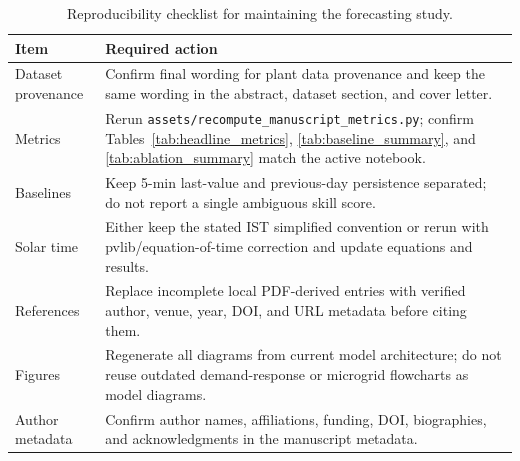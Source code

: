 \begin{table}[!t]
\caption{Reproducibility checklist for maintaining the forecasting study.}
\label{tab:reproducibility_checklist}
\centering
\small
\begin{tabularx}{\textwidth}{@{}l>{\raggedright\arraybackslash}X@{}}
\toprule
Item & Required action \\
\midrule
Dataset provenance & Confirm final wording for plant data provenance and keep the same wording in the abstract, dataset section, and cover letter. \\
Metrics & Rerun \texttt{assets/recompute\_manuscript\_metrics.py}; confirm Tables~\ref{tab:headline_metrics}, \ref{tab:baseline_summary}, and \ref{tab:ablation_summary} match the active notebook. \\
Baselines & Keep 5-min last-value and previous-day persistence separated; do not report a single ambiguous skill score. \\
Solar time & Either keep the stated IST simplified convention or rerun with pvlib/equation-of-time correction and update equations and results. \\
References & Replace incomplete local PDF-derived entries with verified author, venue, year, DOI, and URL metadata before citing them. \\
Figures & Regenerate all diagrams from current model architecture; do not reuse outdated demand-response or microgrid flowcharts as model diagrams. \\
Author metadata & Confirm author names, affiliations, funding, DOI, biographies, and acknowledgments in the manuscript metadata. \\
\bottomrule
\end{tabularx}
\end{table}
